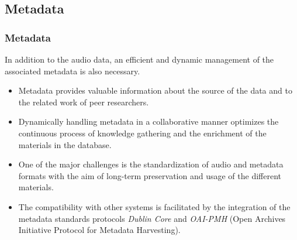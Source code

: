 \documentclass[final, hyperref, table]{beamer}
\begin{document}
\subsection{Metadata}\label{sec:metadata}
\begin{frame}\frametitle{Metadata}
  \begin{block}{}
    In addition to the audio data, an efficient and dynamic management
    of the associated metadata is also necessary.
    \begin{itemize}
    \item Metadata provides valuable information about the
      \alert{source of the data} and to the related \alert{work of
        peer researchers}.
    \item Dynamically handling metadata in a \alert{collaborative}
      manner optimizes the continuous process of knowledge gathering
      and the \alert{enrichment} of the materials in the database.
    \item One of the major challenges is the \alert{standardization}
      of audio and metadata formats with the aim of long-term
      preservation and usage of the different materials.
    \item The compatibility with other systems is facilitated by the
      integration of the \alert{metadata standards protocols}
      \emph{Dublin Core} and \emph{OAI-PMH} (Open Archives Initiative
      Protocol for Metadata Harvesting).
    \end{itemize}
  \end{block}
\end{frame}
\end{document}
